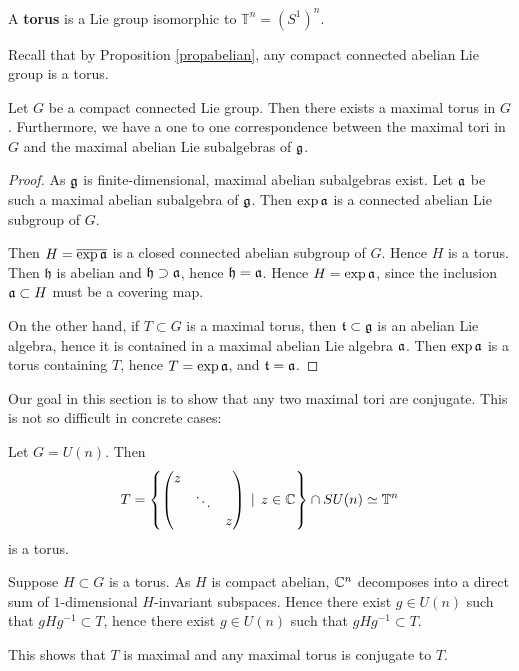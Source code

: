 \documentclass[11pt, english]{article}
\begin{document}
A \textbf{torus} is a Lie group isomorphic to $\mathbb T^n = {(S^1)}^n$. 

Recall that by Proposition \ref{propabelian}, any compact connected abelian Lie group is a torus.

\begin{prop}
 Let $G$ be a compact connected Lie group. Then there exists a maximal torus in $G$. Furthermore, we have a one to one correspondence between the maximal tori in $G$ and the maximal abelian Lie subalgebras of $\mathfrak g$.
\end{prop}
\begin{proof}

As $\mathfrak g$ is finite-dimensional, maximal abelian subalgebras exist. Let $\mathfrak{a}$ be such a maximal abelian subalgebra of $\mathfrak g$. Then $\exp \mathfrak{a}$ is a connected abelian Lie subgroup of $G$.

Then $H = \overline {\exp \mathfrak{a}  }$ is a closed connected abelian subgroup of $G$. Hence $H$ is a torus. Then $\mathfrak h$ is abelian and $\mathfrak h \supset \mathfrak{a}$, hence $\mathfrak h = \mathfrak{a}$. Hence $H = \exp \mathfrak{a}$, since the inclusion $\mathfrak{a} \subset H$ must be a covering map.  

On the other hand, if $T \subset G$ is a maximal torus, then $\mathfrak t \subset \mathfrak g$ is an abelian Lie algebra, hence it is contained in a maximal abelian Lie algebra $\mathfrak{a}$. Then $\exp \mathfrak{a}$ is a torus containing $T$, hence $T= \exp \mathfrak{a}$, and $\mathfrak t = \mathfrak{a}$.
\end{proof}

Our goal in this section is to show that any two maximal tori are conjugate. This is not so difficult in concrete cases:

\begin{example}
 Let $G=U(n)$. Then
$$
T = \left\{ \begin{pmatrix} 
z && \\
& \ddots & \\
&& z 
\end{pmatrix} \, \mid \, z \in \mathbb{C} \right\} \cap SU(n) \simeq \mathbb T^n
$$
is a torus. 

Suppose $H \subset G$ is a torus. As $H$ is compact abelian, $\mathbb{C}^n$ decomposes into a direct sum of $1$-dimensional $H$-invariant subspaces. Hence there exist $g \in U(n)$ such that $gHg^{-1} \subset T$, hence there exist $g \in U(n)$ such that $gHg^{-1} \subset T$. 

This shows that $T$ is maximal and any maximal torus is conjugate to $T$.
\end{example}
\end{document}
